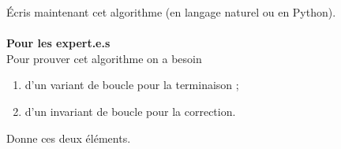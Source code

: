 \documentclass[a4paper,10pt,french]{article}
\begin{document}
\'Ecris maintenant cet algorithme (en langage naturel ou en Python).\\

\\

\textbf{Pour les expert.e.s}\\

Pour prouver cet algorithme on a besoin 
\begin{enumerate}[--]
	\item 	d'un variant de boucle pour la terminaison ;
	\item 	d'un invariant de boucle pour la correction.
\end{enumerate}
Donne ces deux éléments.\\

\end{document}
